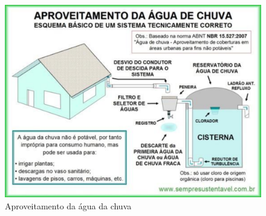 \begin{figure}[H]
\centering
\includegraphics[keepaspectratio,scale=0.6]{figuras/aproveitamento_chuva.eps}
\caption{Aproveitamento da água da chuva}
\end{figure}

